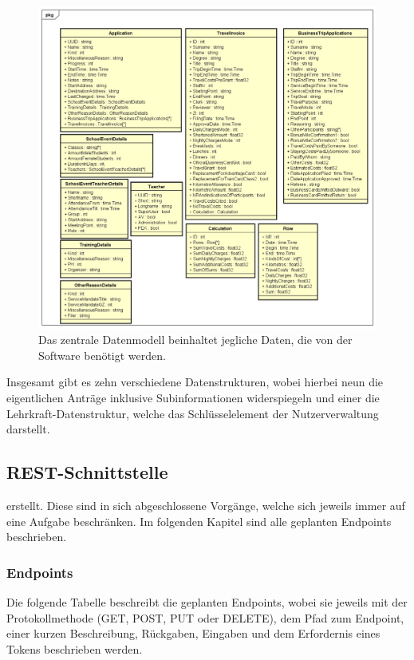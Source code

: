 \begin{figure}[H]
	\centering
	\includegraphics[width=\linewidth]{images/mbeier_konzept/Datamodel}
	\caption[Zentrales Datenmodell]{Das zentrale Datenmodell beinhaltet jegliche Daten, die von der Software benötigt werden.}
	\label{fig:datamodel}
\end{figure}

Insgesamt gibt es zehn verschiedene Datenstrukturen, wobei hierbei neun die eigentlichen Anträge inklusive Subinformationen widerspiegeln und einer die Lehrkraft-Datenstruktur, welche das Schlüsselelement der Nutzerverwaltung darstellt.

\newpage

\subsection{REST-Schnittstelle}

 erstellt. Diese sind in sich abgeschlossene Vorgänge, welche sich jeweils immer auf eine Aufgabe beschränken. Im folgenden Kapitel sind alle geplanten Endpoints beschrieben.

\subsubsection{Endpoints}
\label{chapter:endpoints}

Die folgende Tabelle beschreibt die geplanten Endpoints, wobei  sie jeweils mit der Protokollmethode (GET, POST, PUT oder DELETE), dem Pfad zum Endpoint, einer kurzen Beschreibung, Rückgaben, Eingaben und dem Erfordernis eines Tokens beschrieben werden.

